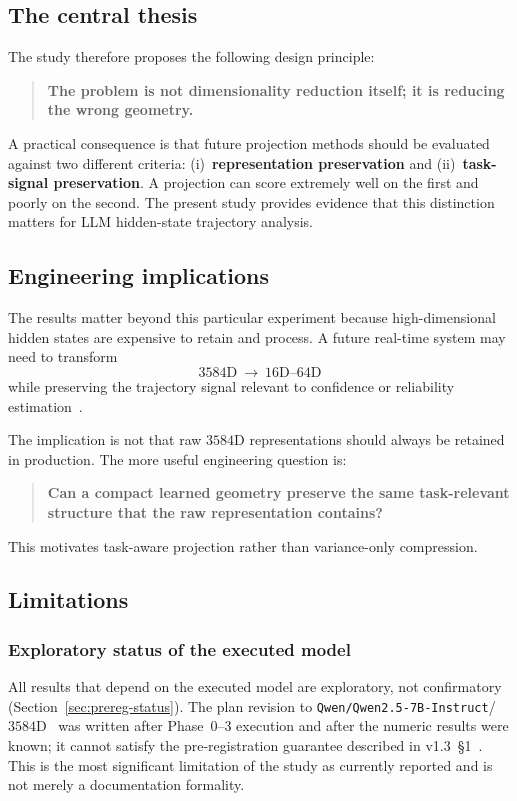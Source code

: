 \documentclass{article}
\begin{document}
\subsection{The central thesis}
\label{sec:disc-thesis}

The study therefore proposes the following design principle:
\begin{quote}
\textbf{The problem is not dimensionality reduction itself; it is reducing the wrong geometry.}
\end{quote}
A practical consequence is that future projection methods should be evaluated against two different criteria:
(i)~\textbf{representation preservation} and
(ii)~\textbf{task-signal preservation}.
A projection can score extremely well on the first and poorly on the second.
The present study provides evidence that this distinction matters for {LLM} hidden-state trajectory analysis.

\subsection{Engineering implications}
\label{sec:disc-eng}

The results matter beyond this particular experiment because high-dimensional hidden states are expensive to retain and process.
A future real-time system may need to transform
\begin{equation}
  3584\mathrm{D}\ \rightarrow\ 16\mathrm{D}\text{--}64\mathrm{D}
\end{equation}
while preserving the trajectory signal relevant to confidence or reliability estimation~\citep{kadavath2022,farquhar2024semantic}.

The implication is not that raw $3584${D} representations should always be retained in production. The more useful engineering question is:
\begin{quote}
\textbf{Can a compact learned geometry preserve the same task-relevant structure that the raw representation contains?}
\end{quote}
This motivates task-aware projection rather than variance-only compression.

\subsection{Limitations}
\label{sec:limits}

\subsubsection{Exploratory status of the executed model}
All results that depend on the executed model are exploratory, not confirmatory (Section~\ref{sec:prereg-status}). The plan revision to \texttt{Qwen/Qwen2.5-7B-Instruct}/$3584${D}~\citep{exptrj001plan} was written after Phase~0--3 execution and after the numeric results were known; it cannot satisfy the pre-registration guarantee described in v1.3~\S1~\citep{exptrj001planv13}. This is the most significant limitation of the study as currently reported and is not merely a documentation formality.
\end{document}
